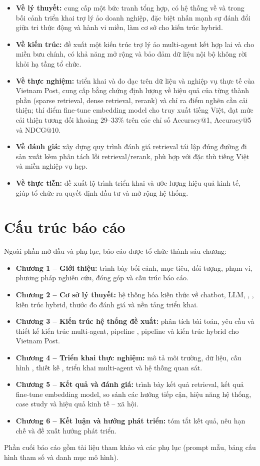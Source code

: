 \begin{itemize}
  \item \textbf{Về lý thuyết:} cung cấp một bức tranh tổng hợp, có hệ thống về \rag{} và
  \ft{} trong bối cảnh triển khai trợ lý ảo doanh nghiệp, đặc biệt nhấn mạnh sự đánh đổi
  giữa tri thức động và hành vi miền, làm cơ sở cho kiến trúc hybrid.
  \item \textbf{Về kiến trúc:} đề xuất một kiến trúc trợ lý ảo multi-agent kết hợp \rag{} lai
  và \ft{} cho miền bưu chính, có khả năng mở rộng và bảo đảm dữ liệu nội bộ không rời khỏi
  hạ tầng tổ chức.
  \item \textbf{Về thực nghiệm:} triển khai và đo đạc trên dữ liệu và nghiệp vụ thực tế của
  Vietnam Post, cung cấp bằng chứng định lượng về hiệu quả của từng thành phần (sparse retrieval,
  dense retrieval, rerank) và chỉ ra điểm nghẽn cần cải thiện; thí điểm fine-tune embedding
  model cho truy xuất tiếng Việt, đạt mức cải thiện tương đối khoảng 29--33\% trên các chỉ số
  Accuracy@1, Accuracy@5 và NDCG@10.
  \item \textbf{Về đánh giá:} xây dựng quy trình đánh giá retrieval tái lập đúng đường đi sản
  xuất kèm phân tách lỗi retrieval/rerank, phù hợp với đặc thù tiếng Việt và miền nghiệp vụ hẹp.
  \item \textbf{Về thực tiễn:} đề xuất lộ trình triển khai và ước lượng hiệu quả kinh tế,
  giúp tổ chức ra quyết định đầu tư và mở rộng hệ thống.
\end{itemize}

\section{Cấu trúc báo cáo}

Ngoài phần mở đầu và phụ lục, báo cáo được tổ chức thành sáu chương:

\begin{itemize}
  \item \textbf{Chương 1 -- Giới thiệu:} trình bày bối cảnh, mục tiêu, đối tượng, phạm vi, phương
  pháp nghiên cứu, đóng góp và cấu trúc báo cáo.
  \item \textbf{Chương 2 -- Cơ sở lý thuyết:} hệ thống hóa kiến thức về chatbot, LLM, \rag, \ft,
  kiến trúc hybrid, thước đo đánh giá và nền tảng triển khai.
  \item \textbf{Chương 3 -- Kiến trúc hệ thống đề xuất:} phân tích bài toán, yêu cầu và thiết kế
  kiến trúc multi-agent, pipeline \rag, pipeline \ft{} và kiến trúc hybrid cho Vietnam Post.
  \item \textbf{Chương 4 -- Triển khai thực nghiệm:} mô tả môi trường, dữ liệu, cấu hình \rag,
  thiết kế \ft, triển khai multi-agent và hệ thống quan sát.
  \item \textbf{Chương 5 -- Kết quả và đánh giá:} trình bày kết quả retrieval, kết quả fine-tune
  embedding model, so sánh các hướng tiếp cận, hiệu năng hệ thống, case study và hiệu quả
  kinh tế -- xã hội.
  \item \textbf{Chương 6 -- Kết luận và hướng phát triển:} tóm tắt kết quả, nêu hạn chế và đề xuất
  hướng phát triển.
\end{itemize}

Phần cuối báo cáo gồm tài liệu tham khảo và các phụ lục (prompt mẫu, bảng cấu hình tham
số và danh mục mô hình).

